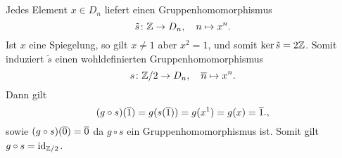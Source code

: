 \subsection{}

Jedes Element $x \in D_n$ liefert einen Gruppenhomomorphismus
\[
          \tilde{s}
  \colon  \mathbb{Z}
  \to     D_n,
  \quad   n
  \mapsto x^n.
\]
Ist $x$ eine Spiegelung, so gilt $x \neq 1$ aber $x^2 = 1$, und somit $\ker \tilde{s} = 2\mathbb{Z}$.
Somit induziert $\tilde{s}$ einen wohldefinierten Gruppenhomomorphismus
\[
          s
  \colon  \mathbb{Z}/2
  \to     D_n,
  \quad   \overline{n}
  \mapsto x^n.
\]
Dann gilt
\[
    (g \circ s)(\overline{1})
  = g(s(\overline{1}))
  = g(x^1)
  = g(x)
  = \overline{1}.,
\]
sowie $(g \circ s)(\overline{0}) = \overline{0}$ da $g \circ s$ ein Gruppenhomomorphismus ist.
Somit gilt $g \circ s = \operatorname{id}_{\mathbb{Z}/2}$.





\addtocounter{subsection}{1}
